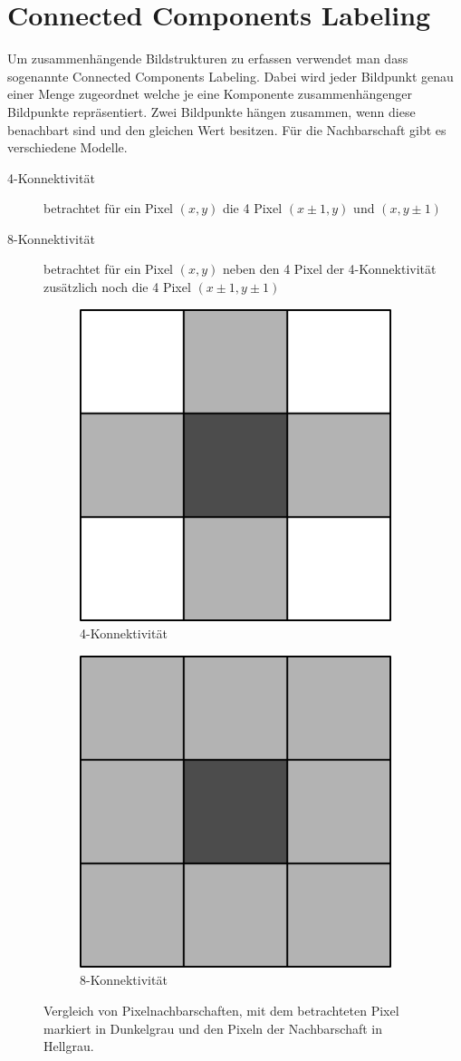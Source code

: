 \section{Connected Components Labeling}
\label{sec:connected-components}
\writtenby{\dcauthornameewie}%
Um zusammenhängende Bildstrukturen zu erfassen verwendet man dass sogenannte Connected Components Labeling.
Dabei wird jeder Bildpunkt genau einer Menge zugeordnet welche je eine Komponente zusammenhängenger Bildpunkte repräsentiert.
Zwei Bildpunkte hängen zusammen, wenn diese benachbart sind und den gleichen Wert besitzen.
Für die Nachbarschaft gibt es verschiedene Modelle.
%
\begin{description}
\item[4-Konnektivität] betrachtet für ein Pixel $(x,y)$ die 4 Pixel $(x\pm1,y)$ und $(x,y\pm1)$
\item[8-Konnektivität] betrachtet für ein Pixel $(x,y)$ neben den 4 Pixel der 4-Konnektivität zusätzlich noch die 4 Pixel $(x\pm1,y\pm1)$
\end{description}
%
\begin{figure}[H]
  \centering
  \begin{subfigure}{0.3\columnwidth}
    \centering
    \includegraphics[width=0.5\columnwidth]{img/basics/connected-compontents/4-connectivity}
    \caption{4-Konnektivität}
  \end{subfigure}
  \begin{subfigure}{0.3\columnwidth}
    \centering
    \includegraphics[width=0.5\columnwidth]{img/basics/connected-compontents/8-connectivity}
    \caption{8-Konnektivität}
  \end{subfigure}
  \caption[Vergleich von Pixelnachbarschaften]{Vergleich von Pixelnachbarschaften, mit dem betrachteten Pixel markiert in Dunkelgrau und den Pixeln der Nachbarschaft in Hellgrau.}
\end{figure}
